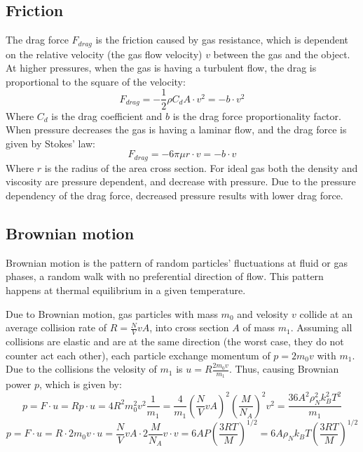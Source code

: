 \documentclass[\main/master.tex]{subfiles}
\begin{document}
\subsection{Friction}
The drag force $F_{drag}$ is the friction caused by gas resistance, which is dependent on the relative velocity (the gas flow velocity) $v$ between the gas and the object. At higher pressures, when the gas is having a turbulent flow, the drag is proportional to the square of the velocity:
\begin{equation}
F_{drag} = -\frac{1}{2}\rho C_d A \cdot v^2 = -b\cdot v^2 
\label{eqn:drag force}
\end{equation}
Where $C_d$ is the drag coefficient and $b$ is the drag force proportionality factor. When pressure decreases the gas is having a laminar flow, and the drag force is given by Stokes' law:
\begin{equation}
F_{drag} = -6\pi\mu r\cdot v = -b\cdot v
\label{eqn:drag force}
\end{equation}
Where $r$ is the radius of the area cross section. For ideal gas both the density and viscosity are pressure dependent, and decrease with pressure. Due to the pressure dependency of the drag force, decreased pressure results with lower drag force.

\subsection{Brownian motion}
Brownian motion is the pattern of random particles' fluctuations at fluid or gas phases, a random walk with no preferential direction of flow. This pattern happens at thermal equilibrium in a given temperature.
\par\noindent
Due to Brownian motion, gas particles with mass $m_0$ and velosity $v$ collide at an average collision rate of $R= \frac{N}{V} v A$, into cross section $A$ of mass $m_1$. Assuming all collisions are elastic and are at the same direction (the worst case, they do not counter act each other), each particle exchange momentum of $ p = 2 m_0 v$ with $m_1$. Due to the collisions the velosity of $m_1$ is $ u = R\frac{2m_0 v}{m_1}$. Thus, causing Brownian power $p$, which is given by:
\begin{equation}
p = F\cdot u =  R p\cdot u=  4 R^2 m_0^2 v^2  \frac{1}{m_1} = \frac{4}{m_1} (\frac{N}{V} v A)^2 (\frac{M}{N_A})^2 v^2  =  \frac{36 A^2 \rho_N^2 k_B^2 T^2}{m_1}  
\label{eqn:Brownian power}
\end{equation}
\begin{equation}
p = F\cdot u = R\cdot 2 m_0 v \cdot u = \frac{N}{V} v A \cdot 2 \frac{M}{N_A} v \cdot v = 6 A P  (\frac{3RT}{M})^{1/2} = 6 A \rho_N k_B T  (\frac{3RT}{M})^{1/2}   
\label{eqn:Brownian power}
\end{equation}
\end{document}
